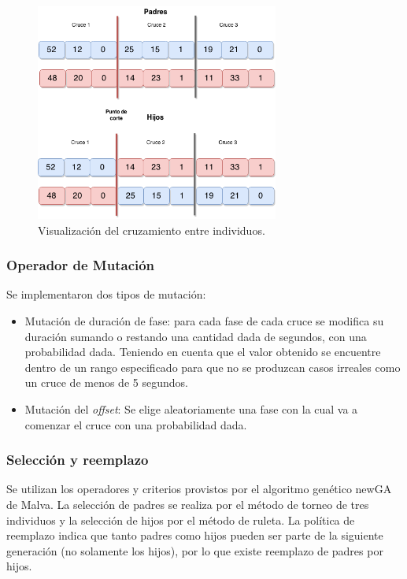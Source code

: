 \begin{figure}[H]
	\centering
	\includegraphics[width=8cm]{Figures/alg_cruzamiento}
	\caption{Visualización del cruzamiento entre individuos.}
	\label{fig:op_cruzamiento}
\end{figure}



\subsubsection{Operador de Mutación}
Se implementaron dos tipos de mutación:
\begin{itemize}
	
	\item Mutación de duración de fase: para cada fase de cada cruce se modifica su duración sumando o restando una cantidad dada de segundos, con una probabilidad dada. Teniendo en cuenta que el valor obtenido se encuentre dentro de un rango especificado para que no se produzcan casos irreales como un cruce de menos de 5 segundos.
	
	\item Mutación del \emph{offset}: Se elige aleatoriamente una fase con la cual va a comenzar el cruce con una probabilidad dada.
\end{itemize}

\subsubsection{Selección y reemplazo}
Se  utilizan los operadores y criterios provistos por el algoritmo genético newGA de Malva. La selección de padres se realiza por el método de torneo de tres individuos y la selección de hijos por el método de ruleta. La política de reemplazo indica que tanto padres como hijos pueden ser parte de la siguiente generación (no solamente los hijos), por lo que existe reemplazo de padres por hijos.

